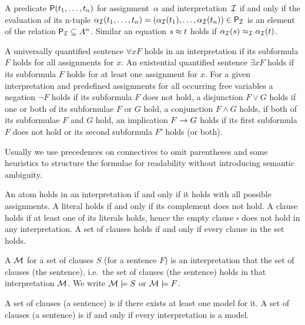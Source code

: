 \begin{definition}\label{def:semantics:atoms}
	A predicate \( \mathsf{P}(t_1,\ldots,t_n) \)
	 for assignment~\( \alpha \)
	and interpretation~\( \mathcal{I} \)
	if and only if the evaluation of its n-tuple \(
	\alpha_{\mathcal{I}}(t_1,\ldots,t_n) = (\alpha_{\mathcal{I}}({t_1}),\ldots,\alpha_{\mathcal{I}}({t_n})) \in \mathsf{P}_{\mathcal{I}} \)
	is an element of the relation \( \mathsf{P}_{\mathcal{I}}\subseteq A^n \).
	Similar an equation \( s\approx t \)
	holds if \( \alpha_{\mathcal{I}}(s) \approx_{\mathcal{I}} \alpha_{\mathcal{I}}(t) \).
\end{definition}

\begin{definition}
	\label{def:semantics:FOF}
	A universally quantified sentence \( \forall x F \)
	holds in an interpretation if its subformula \( F \) holds for all assignments for \( x \).
	An existential quantified sentence \( \exists xF \) holds if its subformula \( F \) holds for at least one assignment for \( x \).
	For a given interpretation and predefined assignments for all occurring free variables
	a negation \( \lnot F \) holds if its subformula \( F \) does not hold,
	a disjunction \( F\lor G \) holds if one or both of its subformulae \( F \) or \( G \) hold,
	a conjunction \( F\land G \) holds, if both of its subformulae \( F \) and \( G \) hold,
	an implication \( F\rightarrow G \) holds if its first subformula \( F \) does not hold or its second subformula \( F' \) holds (or both).

	\begin{remark}Usually we use precedences on connectives to omit parentheses
		and some heuristics to structure the formulae for readability
		without introducing semantic ambiguity.
	\end{remark}
\end{definition}

\begin{definition}\label{def:semantics:CNF}
	An atom holds in an interpretation if and only if it
	holds with all possible assignments.
	A literal holds if and only if its complement does not hold.
	A clause holds if at least one of its literals holds,
	hence the empty clause \( \square \) does not hold in any interpretation.
	A set of clauses holds if and only if every clause in the set holds.
\end{definition}

\begin{definition}
	A  \( \mathcal{M} \) for a set of clauses \( S \) (for a sentence \( F \))
	is an interpretation that
	 the set of clauses (the sentence),
	i.e.~the set of clauses (the sentence) holds in that interpretation \( \mathcal{M} \).
	We write \( \mathcal{M}\models S \) or \( \mathcal{M}\models F \).

	A set of clauses (a sentence) is  if there exists at least one model for it.
	A set of clauses (a sentence) is  if and only if every interpretation is a model.
\end{definition}

